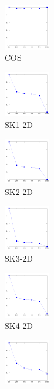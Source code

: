 \documentclass[a4paper,10pt]{article}
\begin{document}
\begin{figure}[ht]{\ContinuedFloat\centering
\begin{subfigure}[b]{2.5cm}
\centering
\includegraphics[height=2cm]{allcat_COS.pdf}
\caption{COS}
\end{subfigure} 
\begin{subfigure}[b]{2.5cm}
\centering
\includegraphics[height=2cm]{allcat_SK1-2D.pdf}
\caption{SK1-2D}
\end{subfigure} 
\begin{subfigure}[b]{2.5cm}
\centering
\includegraphics[height=2cm]{allcat_SK2-2D.pdf}
\caption{SK2-2D}
\end{subfigure} 
\begin{subfigure}[b]{2.5cm}
\centering
\includegraphics[height=2cm]{allcat_SK3-2D.pdf}
\caption{SK3-2D}
\end{subfigure} 
\begin{subfigure}[b]{2.5cm}
\centering
\includegraphics[height=2cm]{allcat_SK4-2D.pdf}
\caption{SK4-2D}
\end{subfigure} 
\begin{subfigure}[b]{2.5cm}
\centering
\includegraphics[height=2cm]{allcat_XVB-0-0_05.pdf}

\end{subfigure}}
\end{figure}
\end{document}
